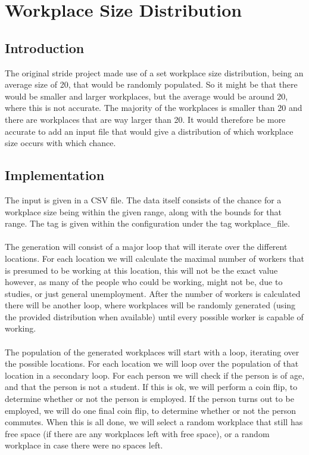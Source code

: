 \documentclass[runningheads]{llncs}
\begin{document}
	\section{Workplace Size Distribution}
	\subsection{Introduction}
	The original stride project made use of a set workplace size distribution, being an average size of 20, that would be randomly populated. So it might be that there would be smaller and larger workplaces, but the average would be around 20, where this is not accurate. The majority of the workplaces is smaller than 20 and there are workplaces that are way larger than 20. It would therefore be more accurate to add an input file that would give a distribution of which workplace size occurs with which chance.
	\subsection{Implementation}
	The input is given in a CSV file. The data itself consists of the chance for a workplace size being within the given range, along with the bounds for that range. The tag is given within the configuration under the tag workplace\_file. \\
	\\
	The generation will consist of a major loop that will iterate over the different locations. For each location we will calculate the maximal number of workers that is presumed to be working at this location, this will not be the exact value however, as many of the people who could be working, might not be, due to studies, or just general unemployment. After the number of workers is calculated there will be another loop, where workplaces will be randomly generated (using the provided distribution when available) until every possible worker is capable of working. \\
	\\
	The population of the generated workplaces will start with a loop, iterating over the possible locations. For each location we will loop over the population of that location in a secondary loop. For each person we will check if the person is of age, and that the person is not a student. If this is ok, we will perform a coin flip, to determine whether or not the person is employed. If the person turns out to be employed, we will do one final coin flip, to determine whether or not the person commutes. When this is all done, we will select a random workplace that still has free space (if there are any workplaces left with free space), or a random workplace in case there were no spaces left. 
\end{document}
